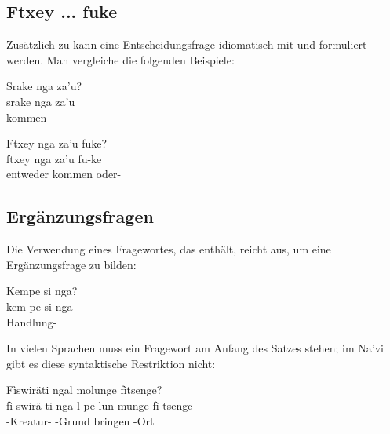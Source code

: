 \subsection{Ftxey ... fuke} Zusätzlich zu  kann eine Entscheidungsfrage idiomatisch mit   und   formuliert werden. Man vergleiche die folgenden Beispiele:\label{syn:question:ftxey}

\begin{interlin}
	\glll \Npawl{}Srake nga za'u? \\
	srake nga za'u \\
	  kommen \\
\end{interlin}

\begin{interlin}
	\glll \Npawl{}Ftxey nga za'u fuke? \\
	ftxey nga za'u fu-ke \\
	entweder  kommen oder- \\
\end{interlin}

\subsection{Ergänzungsfragen} Die Verwendung eines Fragewortes, das  enthält, reicht aus, um eine Ergänzungsfrage zu bilden: 

\begin{interlin}
	\glll Kempe si nga? \\
	kem-pe si nga \\
	Handlung-   \\
\end{interlin}

\noindent In vielen Sprachen muss ein Fragewort am Anfang des Satzes stehen; im Na'vi gibt es diese syntaktische Restriktion nicht:

\begin{interlin}
	\glll \Nfilm{}Fìswiräti ngal  molunge fìtsenge? \\
	fì-swirä-ti nga-l pe-lun munge fì-tsenge \\
	-Kreatur-  -Grund bringen -Ort \\
\end{interlin}

